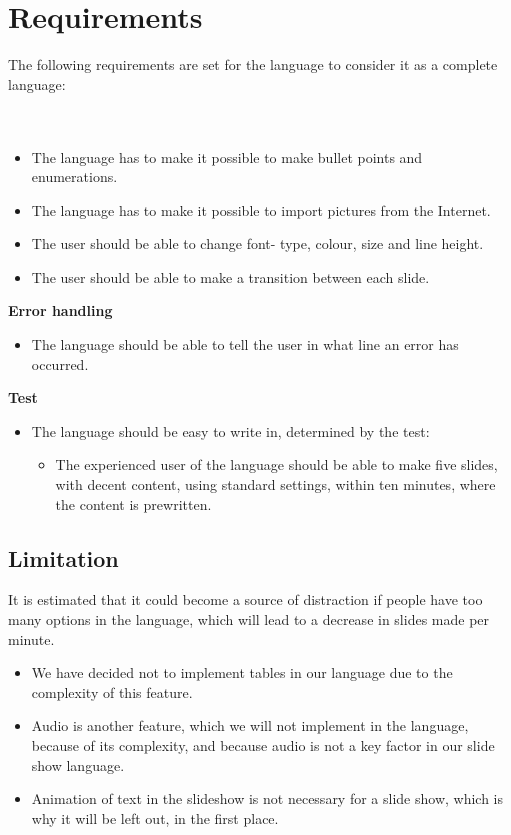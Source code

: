 \section{Requirements}
The following requirements are set for the language to consider it as a complete language:
\\ \\
 \\
\begin{itemize}
\item The language has to make it possible to make bullet points and enumerations.
\item The language has to make it possible to import pictures from the Internet.
\item The user should be able to change font- type, colour, size and line height.
\item The user should be able to make a transition between each slide. 
\end{itemize}
\textbf{Error handling}\\
\begin{itemize}
\item The language should be able to tell the user in what line an error has occurred. 
\end{itemize}
\textbf{Test}\\
\begin{itemize}
\item The language should be easy to write in, determined by the test:
\begin{itemize}
\item The experienced user of the language should be able to make five slides, with decent content, using standard settings, within ten minutes, where the content is prewritten.
\end{itemize}
\end{itemize}

\subsection*{Limitation}
It is estimated that it could become a source of distraction if people have too many options in the language, which will lead to a decrease in slides made per minute.

\begin{itemize}
	\item We have decided not to implement tables in our language due to the complexity of this feature.
	\item Audio is another feature, which we will not implement in the language, because of its complexity, and because audio is not a key factor in our slide show language.
	\item Animation of text in the slideshow is not necessary for a slide show, which is why it will be left out, in the first place.
\end{itemize}